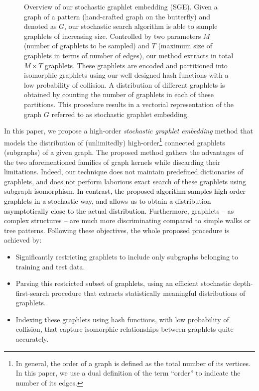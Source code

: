 \documentclass[journal]{IEEEtran}
\theoremstyle{definition}
\begin{document}
\begin{figure*}[!t]
\begin{center}
\caption{Overview of our stochastic graphlet embedding (SGE). Given a graph of a pattern (hand-crafted graph on the butterfly) and denoted as $G$, our stochastic search algorithm is able to sample graphlets of increasing size. Controlled by two parameters $M$ (number of graphlets to be sampled) and $T$ (maximum size of graphlets in terms of number of edges), our method extracts in total $M\times T$ graphlets. These graphlets are encoded and partitioned into isomorphic graphlets using our well designed hash functions with a low probability of collision. A distribution of different graphlets is obtained by counting the number of graphlets in each of these partitions. This procedure results in a vectorial representation of the graph $G$ referred to as stochastic graphlet embedding.}
\label{fig:schematic-diag}
\end{center}
\end{figure*}

In this paper, we propose a high-order \emph{stochastic graphlet embedding} method that models the distribution of (unlimitedly) high-order\footnote{In general, the order of a graph is defined as the total number of its vertices. In this paper, we use a dual definition of the term ``order'' to indicate the number of its edges.} connected graphlets (subgraphs) of a given graph. The proposed method gathers the advantages of the two aforementioned families of graph kernels while discarding their limitations. Indeed, our technique does not maintain predefined dictionaries of graphlets, and does not perform laborious exact search of these graphlets using subgraph isomorphism. \textcolor{black}{In contrast, the proposed algorithm samples high-order graphlets in a stochastic way, and allows us to obtain a distribution asymptotically close to the actual distribution.} Furthermore, graphlets -- as complex structures -- are much more discriminating compared to simple walks or tree patterns. Following these objectives, the whole proposed procedure is achieved by: 
\begin{itemize}
\item Significantly restricting graphlets to include only subgraphs belonging to training and test data.
\item Parsing this restricted subset of \textcolor{black}{graphlets}, using an efficient stochastic depth-first-search procedure that extracts statistically meaningful distributions of graphlets.
\item Indexing these graphlets using hash functions, with low probability of collision, that capture isomorphic relationships between graphlets quite accurately.
\end{itemize}
\end{document}
